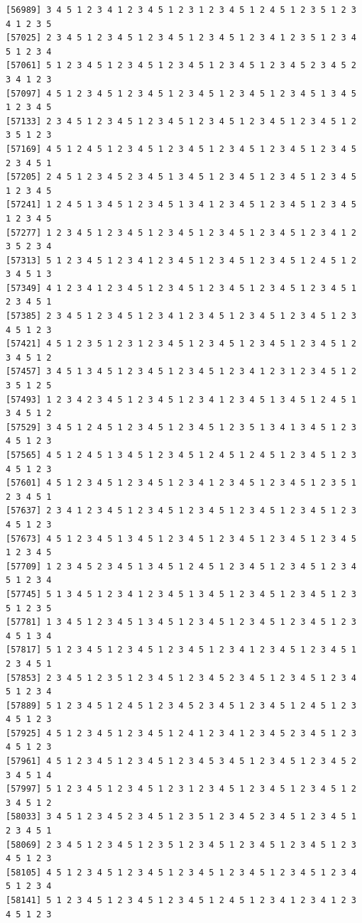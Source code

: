 \documentclass[
  11pt,
]{book}
\begin{document}
\begin{verbatim}
[56989] 3 4 5 1 2 3 4 1 2 3 4 5 1 2 3 1 2 3 4 5 1 2 4 5 1 2 3 5 1 2 3 4 1 2 3 5
[57025] 2 3 4 5 1 2 3 4 5 1 2 3 4 5 1 2 3 4 5 1 2 3 4 1 2 3 5 1 2 3 4 5 1 2 3 4
[57061] 5 1 2 3 4 5 1 2 3 4 5 1 2 3 4 5 1 2 3 4 5 1 2 3 4 5 2 3 4 5 2 3 4 1 2 3
[57097] 4 5 1 2 3 4 5 1 2 3 4 5 1 2 3 4 5 1 2 3 4 5 1 2 3 4 5 1 3 4 5 1 2 3 4 5
[57133] 2 3 4 5 1 2 3 4 5 1 2 3 4 5 1 2 3 4 5 1 2 3 4 5 1 2 3 4 5 1 2 3 5 1 2 3
[57169] 4 5 1 2 4 5 1 2 3 4 5 1 2 3 4 5 1 2 3 4 5 1 2 3 4 5 1 2 3 4 5 2 3 4 5 1
[57205] 2 4 5 1 2 3 4 5 2 3 4 5 1 3 4 5 1 2 3 4 5 1 2 3 4 5 1 2 3 4 5 1 2 3 4 5
[57241] 1 2 4 5 1 3 4 5 1 2 3 4 5 1 3 4 1 2 3 4 5 1 2 3 4 5 1 2 3 4 5 1 2 3 4 5
[57277] 1 2 3 4 5 1 2 3 4 5 1 2 3 4 5 1 2 3 4 5 1 2 3 4 5 1 2 3 4 1 2 3 5 2 3 4
[57313] 5 1 2 3 4 5 1 2 3 4 1 2 3 4 5 1 2 3 4 5 1 2 3 4 5 1 2 4 5 1 2 3 4 5 1 3
[57349] 4 1 2 3 4 1 2 3 4 5 1 2 3 4 5 1 2 3 4 5 1 2 3 4 5 1 2 3 4 5 1 2 3 4 5 1
[57385] 2 3 4 5 1 2 3 4 5 1 2 3 4 1 2 3 4 5 1 2 3 4 5 1 2 3 4 5 1 2 3 4 5 1 2 3
[57421] 4 5 1 2 3 5 1 2 3 1 2 3 4 5 1 2 3 4 5 1 2 3 4 5 1 2 3 4 5 1 2 3 4 5 1 2
[57457] 3 4 5 1 3 4 5 1 2 3 4 5 1 2 3 4 5 1 2 3 4 1 2 3 1 2 3 4 5 1 2 3 5 1 2 5
[57493] 1 2 3 4 2 3 4 5 1 2 3 4 5 1 2 3 4 1 2 3 4 5 1 3 4 5 1 2 4 5 1 3 4 5 1 2
[57529] 3 4 5 1 2 4 5 1 2 3 4 5 1 2 3 4 5 1 2 3 5 1 3 4 1 3 4 5 1 2 3 4 5 1 2 3
[57565] 4 5 1 2 4 5 1 3 4 5 1 2 3 4 5 1 2 4 5 1 2 4 5 1 2 3 4 5 1 2 3 4 5 1 2 3
[57601] 4 5 1 2 3 4 5 1 2 3 4 5 1 2 3 4 1 2 3 4 5 1 2 3 4 5 1 2 3 5 1 2 3 4 5 1
[57637] 2 3 4 1 2 3 4 5 1 2 3 4 5 1 2 3 4 5 1 2 3 4 5 1 2 3 4 5 1 2 3 4 5 1 2 3
[57673] 4 5 1 2 3 4 5 1 3 4 5 1 2 3 4 5 1 2 3 4 5 1 2 3 4 5 1 2 3 4 5 1 2 3 4 5
[57709] 1 2 3 4 5 2 3 4 5 1 3 4 5 1 2 4 5 1 2 3 4 5 1 2 3 4 5 1 2 3 4 5 1 2 3 4
[57745] 5 1 3 4 5 1 2 3 4 1 2 3 4 5 1 3 4 5 1 2 3 4 5 1 2 3 4 5 1 2 3 5 1 2 3 5
[57781] 1 3 4 5 1 2 3 4 5 1 3 4 5 1 2 3 4 5 1 2 3 4 5 1 2 3 4 5 1 2 3 4 5 1 3 4
[57817] 5 1 2 3 4 5 1 2 3 4 5 1 2 3 4 5 1 2 3 4 1 2 3 4 5 1 2 3 4 5 1 2 3 4 5 1
[57853] 2 3 4 5 1 2 3 5 1 2 3 4 5 1 2 3 4 5 2 3 4 5 1 2 3 4 5 1 2 3 4 5 1 2 3 4
[57889] 5 1 2 3 4 5 1 2 4 5 1 2 3 4 5 2 3 4 5 1 2 3 4 5 1 2 4 5 1 2 3 4 5 1 2 3
[57925] 4 5 1 2 3 4 5 1 2 3 4 5 1 2 4 1 2 3 4 1 2 3 4 5 2 3 4 5 1 2 3 4 5 1 2 3
[57961] 4 5 1 2 3 4 5 1 2 3 4 5 1 2 3 4 5 3 4 5 1 2 3 4 5 1 2 3 4 5 2 3 4 5 1 4
[57997] 5 1 2 3 4 5 1 2 3 4 5 1 2 3 1 2 3 4 5 1 2 3 4 5 1 2 3 4 5 1 2 3 4 5 1 2
[58033] 3 4 5 1 2 3 4 5 2 3 4 5 1 2 3 5 1 2 3 4 5 2 3 4 5 1 2 3 4 5 1 2 3 4 5 1
[58069] 2 3 4 5 1 2 3 4 5 1 2 3 5 1 2 3 4 5 1 2 3 4 5 1 2 3 4 5 1 2 3 4 5 1 2 3
[58105] 4 5 1 2 3 4 5 1 2 3 4 5 1 2 3 4 5 1 2 3 4 5 1 2 3 4 5 1 2 3 4 5 1 2 3 4
[58141] 5 1 2 3 4 5 1 2 3 4 5 1 2 3 4 5 1 2 4 5 1 2 3 4 1 2 3 4 1 2 3 4 5 1 2 3

\end{verbatim}
\end{document}
